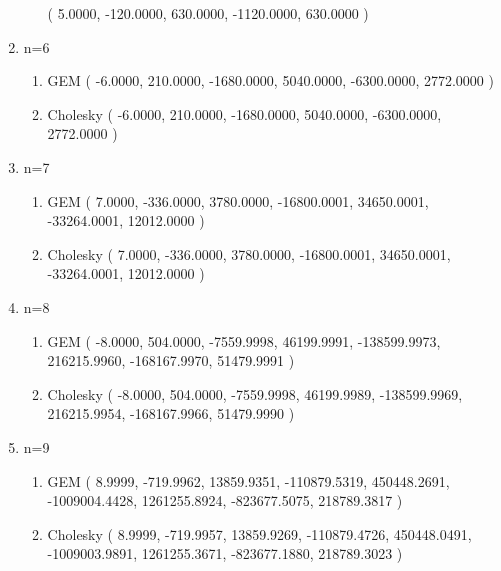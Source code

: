 \documentclass{ctexart}
\begin{document}
\begin{enumerate}
\begin{enumerate}
            ( 5.0000, -120.0000, 630.0000, -1120.0000, 630.0000 )
        \end{enumerate}
        \item n=6
        \begin{enumerate}
            \item GEM\newline
            ( -6.0000, 210.0000, -1680.0000, 5040.0000, -6300.0000, 2772.0000 )
            \item Cholesky\newline
            ( -6.0000, 210.0000, -1680.0000, 5040.0000, -6300.0000, 2772.0000 )
        \end{enumerate}
        \item n=7
        \begin{enumerate}
            \item GEM\newline
            ( 7.0000, -336.0000, 3780.0000, -16800.0001, 34650.0001, -33264.0001, 12012.0000 )
            \item Cholesky\newline
            ( 7.0000, -336.0000, 3780.0000, -16800.0001, 34650.0001, -33264.0001, 12012.0000 )
        \end{enumerate}
        \item n=8
        \begin{enumerate}
            \item GEM\newline
            ( -8.0000, 504.0000, -7559.9998, 46199.9991, -138599.9973, 216215.9960, -168167.9970, 51479.9991 )
            \item Cholesky\newline
            ( -8.0000, 504.0000, -7559.9998, 46199.9989, -138599.9969, 216215.9954, -168167.9966, 51479.9990 )
        \end{enumerate}
        \item n=9
        \begin{enumerate}
            \item GEM\newline
            ( 8.9999, -719.9962, 13859.9351, -110879.5319, 450448.2691, -1009004.4428, 1261255.8924, -823677.5075, 218789.3817 )
            \item Cholesky\newline
            ( 8.9999, -719.9957, 13859.9269, -110879.4726, 450448.0491, -1009003.9891, 1261255.3671, -823677.1880, 218789.3023 )
        \end{enumerate}

\end{enumerate}
\end{document}
